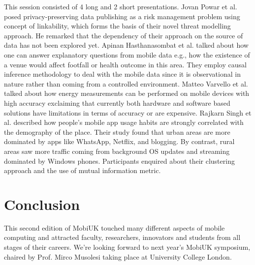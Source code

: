 \documentclass[conference]{IEEEtran}
\begin{document}
This session consisted of 4 long and 2 short presentations. Jovan Powar et al. posed privacy-preserving data publishing as a risk management problem using concept of linkability, which forms the basis of their novel threat modelling approach. He remarked that the dependency of their approach on the source of data has not been explored yet. 
Apinan Hasthanasombat et al. talked about how one can answer explanatory questions from mobile data e.g., how the existence of a venue would affect footfall or health outcome in this area. They employ causal inference methodology to deal with the mobile data since it is observational in nature rather than coming from a controlled environment. 
Matteo Varvello et al. talked about how energy measurements can be performed on mobile devices with high accuracy exclaiming that currently both hardware and software based solutions have limitations in terms of accuracy or are expensive. 
Rajkarn Singh et al. described how people’s mobile app usage habits are strongly correlated with the demography of the place. Their study found that urban areas are more dominated by apps like WhatsApp, Netflix, and blogging. By contrast, rural areas saw more traffic coming from background OS updates and streaming dominated by Windows phones. Participants enquired about their clustering approach and the use of mutual information metric.


\section{Conclusion}

This second edition of MobiUK touched many different aspects of mobile computing and attracted faculty, researchers, innovators and students from all stages of their careers. We’re looking forward to next year’s MobiUK symposium, chaired by Prof. Mirco Musolesi taking place at University College London. 
\end{document}
